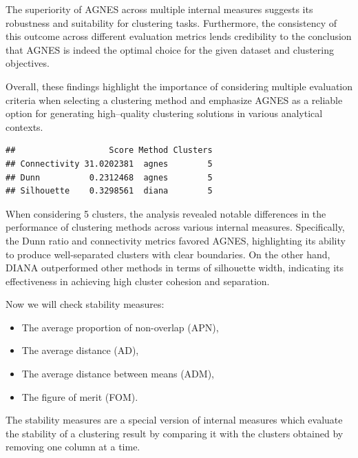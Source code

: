 \documentclass[11pt,a4paper]{article}\usepackage[]{graphicx}\usepackage[]{xcolor}
\makeatletter
\newenvironment{kframe}{%
 \def\at@end@of@kframe{}%
 \ifinner\ifhmode%
  \def\at@end@of@kframe{\end{minipage}}%
  \begin{minipage}{\columnwidth}%
 \fi\fi%
 \def\FrameCommand##1{\hskip\@totalleftmargin \hskip-\fboxsep
 \colorbox{shadecolor}{##1}\hskip-\fboxsep
     \hskip-\linewidth \hskip-\@totalleftmargin \hskip\columnwidth}%
 \MakeFramed {\advance\hsize-\width
   \@totalleftmargin\z@ \linewidth\hsize
   \@setminipage}}%
 {\par\unskip\endMakeFramed%
 \at@end@of@kframe}
\newenvironment{knitrout}{}{} %
\makeatother
\begin{document}
The superiority of AGNES across multiple internal measures suggests its robustness and suitability for clustering tasks. Furthermore, the consistency of this outcome across different evaluation metrics lends credibility to the conclusion that AGNES is indeed the optimal choice for the given dataset and clustering objectives.

Overall, these findings highlight the importance of considering multiple evaluation criteria when selecting a clustering method and emphasize AGNES as a reliable option for generating high--quality clustering solutions in various analytical contexts.
	
\begin{knitrout}
\color{fgcolor}\begin{kframe}
\begin{verbatim}
##                   Score Method Clusters
## Connectivity 31.0202381  agnes        5
## Dunn          0.2312468  agnes        5
## Silhouette    0.3298561  diana        5
\end{verbatim}
\end{kframe}
\end{knitrout}
	
	
	When considering 5 clusters, the analysis revealed notable differences in the performance of clustering methods across various internal measures. Specifically, the Dunn ratio and connectivity metrics favored AGNES, highlighting its ability to produce well-separated clusters with clear boundaries. On the other hand, DIANA outperformed other methods in terms of silhouette width, indicating its effectiveness in achieving high cluster cohesion and separation.
	
	
	
	Now we will check stability measures:
	\begin{itemize}
		\item The average proportion of non-overlap (APN),
		\item The average distance (AD),
		\item The average distance between means (ADM),
		\item The figure of merit (FOM).
	\end{itemize}
	The stability measures are a special version of internal measures which evaluate the stability of a clustering result by comparing it with the clusters obtained by removing one column at a time.
	
\end{document}
